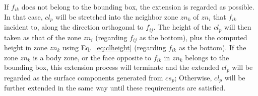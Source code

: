 If $f_{ik}$ does not belong to the bounding box, the extension is
regarded as possible. In that case, $cl_p$ will be stretched into
the neighbor zone $zn_k$ of $zn_i$ that $f_{ik}$ incident to, along
the direction orthogonal to $f_{ij}$. The height of the $cl_p$ will
then taken as that of the zone $zn_i$ (regarding $f_{ij}$ as the
bottom), plus the computed height in zone $zn_k$ using
Eq.~\ref{eq:clheight} (regarding $f_{ik}$ as the bottom). If the
zone $zn_k$ is a body zone, or the face opposite to $f_{ik}$ in
$zn_k$ belongs to the bounding box, this extension process will
terminate and the extended $cl_p$ will be regarded as the surface
components generated from $cs_p$; Otherwise, $cl_p$ will be further
extended in the same way until these requirements are satisfied.

\begin{figure} [htbp]
  \centering
  \subfigure[]{
    \centering
    \label{fig:partition:b}
    \begin{minipage}[b]{0.3\textwidth}
      \centering

\end{minipage}}
\end{figure}
